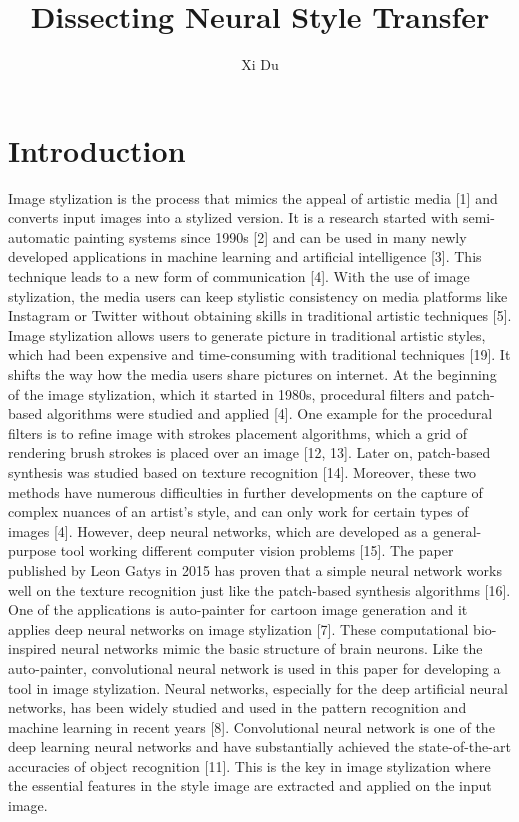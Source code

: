 \documentclass[runningheads]{llncs}
\begin{document}
\title{Dissecting Neural Style Transfer}
\author{Xi Du}
\maketitle 
\begin{abstract}
\cite{method}

\end{abstract}

\section{Introduction}

Image stylization is the process that mimics the appeal of artistic media [1] and converts input images into a stylized version. It is a research started with semi-automatic painting systems since 1990s [2] and can be used in many newly developed applications in machine learning and artificial intelligence [3]. This technique leads to a new form of communication [4]. With the use of image stylization, the media users can keep stylistic consistency on media platforms like Instagram or Twitter without obtaining skills in traditional artistic techniques [5]. Image stylization allows users to generate picture in traditional artistic styles, which had been expensive and time-consuming with traditional techniques [19]. It shifts the way how the media users share pictures on internet. At the beginning of the image stylization, which it started in 1980s, procedural filters and patch-based algorithms were studied and applied [4]. One example for the procedural filters is to refine image with strokes placement algorithms, which a grid of rendering brush strokes is placed over an image [12, 13]. Later on, patch-based synthesis was studied based on texture recognition [14]. Moreover, these two methods have numerous difficulties in further developments on the capture of complex nuances of an artist’s style, and can only work for certain types of images [4]. However, deep neural networks, which are developed as a general-purpose tool working different computer vision problems [15].  The paper published by Leon Gatys in 2015 has proven that a simple neural network works well on the texture recognition just like the patch-based synthesis algorithms [16]. 
One of the applications is auto-painter for cartoon image generation and it applies deep neural networks on image stylization [7]. These computational bio-inspired neural networks mimic the basic structure of brain neurons. Like the auto-painter, convolutional neural network is used in this paper for developing a tool in image stylization. Neural networks, especially for the deep artificial neural networks, has been widely studied and used in the pattern recognition and machine learning in recent years [8]. Convolutional neural network is one of the deep learning neural networks and have substantially achieved the state-of-the-art accuracies of object recognition [11]. This is the key in image stylization where the essential features in the style image are extracted and applied on the input image. 
\end{document}
